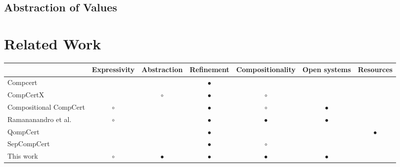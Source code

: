 \documentclass[acmsmall,10pt,review,anonymous]{acmart}
\begin{document}
\subsection{Abstraction of Values} %


\section{Related Work} %

\begin{table*}
  \begin{tabular}{lcccccc}
    \hline
    & Expressivity & Abstraction & Refinement & Compositionality & Open systems & Resources \\
    \hline
    Compcert \cite{compcert}
      &           &           & $\bullet$ &           &           & \\
    CompCertX \cite{popl2015}
      &           & $\circ$   & $\bullet$ & $\circ$   &           & \\
    Compositional CompCert \cite{compcompcert}
      & $\circ$   &           & $\bullet$ & $\circ$   & $\bullet$ & \\
    Ramananandro et al. \cite{cpp2015}
      & $\circ$   &           & $\bullet$ & $\bullet$ & $\bullet$ & \\
    QompCert \cite{qompcert}
      &           &           & $\bullet$ &           &           & $\bullet$ \\
    SepCompCert \cite{lwsc}
      &           &           & $\bullet$ & $\circ$   &           & \\
    This work
      & $\circ$   & $\bullet$ & $\bullet$ & $\bullet$ & $\bullet$ & \\
    \hline
  \end{tabular}
\end{table*}



\end{document}
